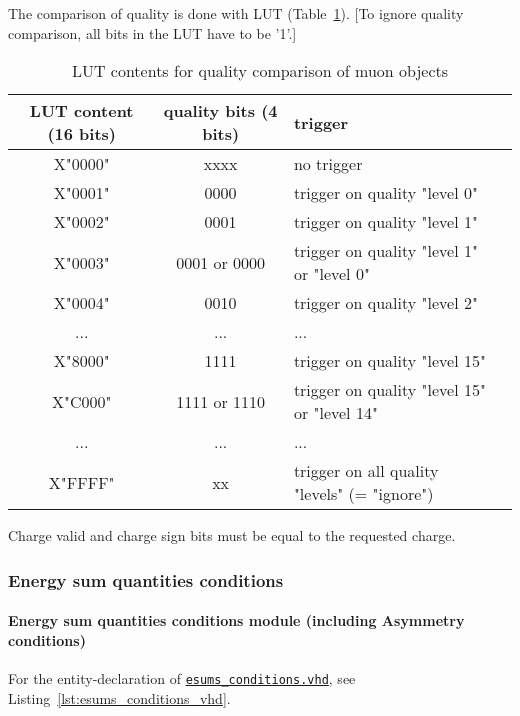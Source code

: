 The comparison of quality is done with LUT (Table~\ref{tab:gtl:muon_lut_qual}). [To ignore quality comparison, all bits in the LUT have to be '1'.]

\begin{table}[htdp]
\begin{center}
\begin{tabular}{|c|c|l|c|}\hline
LUT content (16 bits) & quality bits  (4 bits) & trigger \\\hline\hline
X"0000" & xxxx & no trigger\\\hline
X"0001" & 0000 & trigger on quality "level 0"\\\hline
X"0002" & 0001 & trigger on quality "level 1"\\\hline
X"0003" & 0001 or 0000 & trigger on quality "level 1" or "level 0"\\\hline
X"0004" & 0010 & trigger on quality "level 2"\\\hline
... & ...& ...\\\hline
X"8000" & 1111 & trigger on quality "level 15"\\\hline
X"C000" & 1111 or 1110 & trigger on quality "level 15" or "level 14"\\\hline
... & ...& ...\\\hline
X"FFFF" & xx & trigger on all quality "levels" (= "ignore")\\\hline
\end{tabular}
\end{center}
\caption{LUT contents for quality comparison of muon objects}
\label{tab:gtl:muon_lut_qual}
\end{table}

Charge valid and charge sign bits must be equal to the requested charge.\\

\clearpage

\subsubsection{Energy sum quantities conditions}
\label{sec:gtl:esums_conditions}

\paragraph{Energy sum quantities conditions module (including Asymmetry conditions)}

For the entity-declaration of \href{https://github.com/cms-l1-globaltrigger/mp7_ugt_legacy/tree/master/firmware/hdl/gt_mp7_core/gtl_fdl_wrapper/gtl/esums_conditions.vhd}{\texttt{esums\_conditions.vhd}}, see Listing~\ref{lst:esums_conditions_vhd}.

